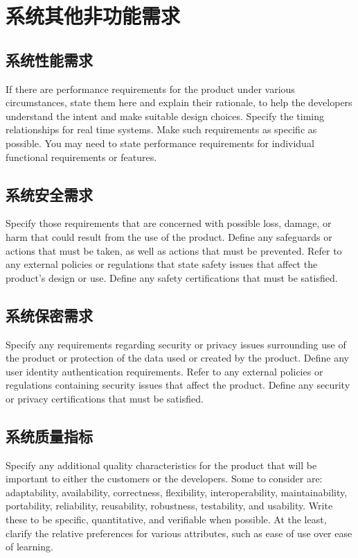 \documentclass{ctexart}
\begin{document}




\section{系统其他非功能需求}\label{S:other-nonfunctional-requirements}
\subsection{系统性能需求}
If there are performance requirements for the product under various
circumstances, state them here and explain their rationale, to help the
developers understand the intent and make suitable design choices. Specify the
timing relationships for real time systems. Make such requirements as specific
as possible. You may need to state performance requirements for individual
functional requirements or features.


\subsection{系统安全需求}
Specify those requirements that are concerned with possible loss, damage, or
harm that could result from the use of the product. Define any safeguards or
actions that must be taken, as well as actions that must be prevented. Refer to
any external policies or regulations that state safety issues that affect the
product's design or use. Define any safety certifications that must be
satisfied.


\subsection{系统保密需求}
Specify any requirements regarding security or privacy issues surrounding use
of the product or protection of the data used or created by the product. Define
any user identity authentication requirements. Refer to any external policies or
regulations containing security issues that affect the product. Define any
security or privacy certifications that must be satisfied.


\subsection{系统质量指标}
Specify any additional quality characteristics for the product that will be
important to either the customers or the developers. Some to consider are:
adaptability, availability, correctness, flexibility, interoperability,
maintainability, portability, reliability, reusability, robustness, testability,
and usability. Write these to be specific, quantitative, and verifiable when
possible. At the least, clarify the relative preferences for various attributes,
such as ease of use over ease of learning.
\end{document}
